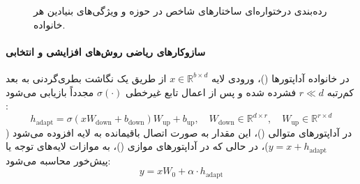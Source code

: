 \begin{figure}[htbp]
\caption{رده‌بندی درختواره‌ای ساختارهای شاخص در حوزه  و ویژگی‌های بنیادین هر خانواده.}
\label{fig:peft_taxonomy}
\end{figure}

\paragraph*{سازوکارهای ریاضی روش‌های افزایشی و انتخابی}
در خانواده آداپتورها ()، ورودی لایه $x \in \mathbb{R}^{b \times d}$ از طریق یک نگاشت بطری‌گردنی به بعد کم‌رتبه $r \ll d$ فشرده شده و پس از اعمال تابع غیرخطی $\sigma(\cdot)$ مجدداً بازیابی می‌شود \cite{houlsby2019parameter, he2021towards}:
\begin{equation}
    h_{\text{adapt}} = \sigma(x W_{\text{down}} + b_{\text{down}}) W_{\text{up}} + b_{\text{up}}, \quad W_{\text{down}} \in \mathbb{R}^{d \times r}, \quad W_{\text{up}} \in \mathbb{R}^{r \times d}
\end{equation}
در آداپتورهای متوالی ()، این مقدار به صورت اتصال باقیمانده به لایه افزوده می‌شود ($y = x + h_{\text{adapt}}$)، در حالی که در آداپتورهای موازی ()، به موازات لایه‌های توجه یا پیش‌خور محاسبه می‌شود:
\begin{equation}
    y = x W_0 + \alpha \cdot h_{\text{adapt}}
\end{equation}

